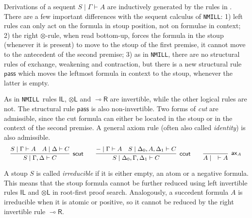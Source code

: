 \documentclass[runningheads]{llncs}
\newcommand{\tl}{\otimes \mathsf{L}}
\newcommand{\lright}{{\multimap}\mathsf{R}}
\newcommand{\pass}{\mathsf{pass}}
\newcommand{\unitl}{\mathsf{IL}}
\newcommand{\otL}{\tl}
\newcommand{\lolliR}{\lright}
\newcommand{\IL}{\unitl}
\newcommand{\ax}{\mathsf{ax}}
\newcommand{\ot}{\otimes}
\newcommand{\NMILL}{\texttt{NMILL}}
\begin{document}
Derivations of a sequent $S \mid \Gamma \vdash A$ are inductively generated by the rules in .
There are a few important differences with the sequent calculus of \NMILL:
1) left rules can only act on the formula in stoup position, not on formulae in context; 2) the right $\ot$-rule, when read bottom-up, forces the formula in the stoup (whenever it is present) to move to the stoup of the first premise, it cannot move to the antecedent of the second premise; 3) as in \NMILL, there are no structural rules of exchange, weakening and contraction, but there is a new structural rule $\pass$ which moves the leftmost formula in context to the stoup, whenever the latter is empty.

As in \NMILL\, rules $\IL$, $\otL$ and $\lolliR$ are invertible, while the other logical rules are not. The structural rule $\pass$ is also non-invertible.
Two forms of \emph{cut} are admissible, since the cut formula can either be located in the stoup or in the context of the second premise. A general axiom rule (often also called \emph{identity}) is also admissible.
\[
\small
    \infer[\mathsf{scut}]{S \mid \Gamma , \Delta \vdash C}{
      S \mid \Gamma \vdash A
      &
      A \mid \Delta \vdash C
    }
    \qquad
    \infer[\mathsf{ccut}]{S \mid \Delta_0 , \Gamma , \Delta_1 \vdash C}{
      - \mid \Gamma \vdash A
      &
      S \mid \Delta_0 , A , \Delta_1 \vdash C
    }
    \qquad
    \infer[\ax_A]{A \mid \quad \vdash A}{}
\]

A stoup $S$ is called \emph{irreducible} if it is either empty, an atom or a negative formula. This means that the stoup formula cannot be further reduced using left invertible rules $\IL$ and $\otL$ in root-first proof search. Analogously, a succedent formula $A$ is irreducible when it is atomic or positive, so it cannot be reduced by the right invertible rule $\lolliR$.
\end{document}

